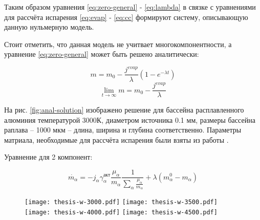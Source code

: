Таким образом уравнения \ref{eq:zero-general} - \ref{eq:lambda} в связке с уравнениями для рассчёта испарения \ref{eq:evap} - \ref{eq:cc} формируют систему, описывающую данную нульмерную модель.

Стоит отметить, что данная модель не учитвает многокомпонентности, а уравнение \ref{eq:zero-general} может быть решено аналитически:

\begin{equation}
    m = m_0 -\frac{j^{evap}}{\lambda} (1 - e^{-\lambda t})
\end{equation}
\begin{equation}
    \lim_{t\rightarrow \infty } m = m_0 - \frac{j^{evap}}{\lambda}
\end{equation}


На рис. \ref{fig:anal-solution} изображено решение для бассейна расплавленного алюминия температурой 3000К, диаметром источника 0.1 мм, размеры бассейна раплава -- 1000 мкм -- длина, ширина и глубина соответственно. Параметры матриала, необходимые для рассчёта испарения были взяты из работы \cite{klassen2018simulation}.


Уравнение для 2 компонент:

\begin{equation}
    \label{eq:zero-double-comp}
    \dot{m_{\alpha}} = -j_{\alpha} \gamma^{\text{акт}}_{\alpha} \frac{\mu_{\alpha}}{m_{\alpha}}\frac{1}{\sum\limits_{\alpha} \frac{\mu_{\alpha}}{m_{\alpha}}} + \lambda (m_{\alpha}^0 - m_{\alpha})
\end{equation}


\begin{figure}
    \texttt{[image: thesis-w-3000.pdf]}\hfill
    \texttt{[image: thesis-w-3500.pdf]}\hfill
    \\[\smallskipamount]
    \texttt{[image: thesis-w-4000.pdf]}\hfill
    \texttt{[image: thesis-w-4500.pdf]}\hfill
\end{figure}


